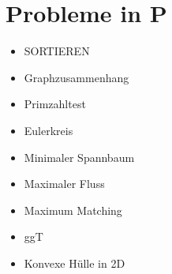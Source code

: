 \documentclass[a4paper,graphics,11pt]{article}
\begin{document}
\newpage

\section*{Probleme in \textsf{P}}

\begin{itemize}
    \item SORTIEREN
    \item Graphzusammenhang
    \item Primzahltest
    \item Eulerkreis
    \item Minimaler Spannbaum
    \item Maximaler Fluss
    \item Maximum Matching
    \item ggT
    \item Konvexe Hülle in 2D
\end{itemize}
\end{document}
